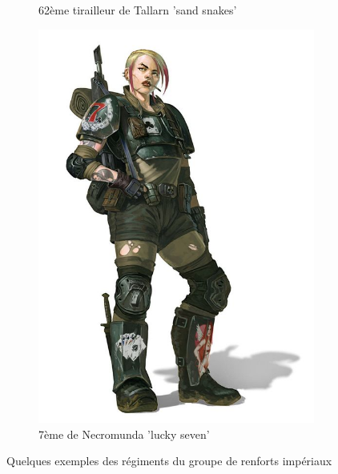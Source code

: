 \documentclass[10pt,a4paper]{book}
\begin{document}
\begin{figure}
\begin{center}
\begin{subfigure}[b]{0.3\textwidth}
     \caption{62ème tirailleur de Tallarn 'sand snakes'}
\end{subfigure}
\begin{subfigure}[b]{0.3\textwidth}
     \centering \includegraphics[height = 0.3\textheight]{necromundan.jpg}
     \caption{7ème de Necromunda 'lucky seven'}
\end{subfigure}
\caption{Quelques exemples des régiments du groupe de renforts impériaux}
\end{center}
\end{figure}
\end{document}
